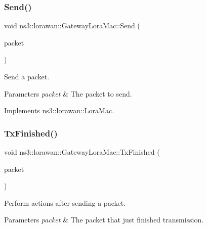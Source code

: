 \mbox{\label{classns3_1_1lorawan_1_1GatewayLoraMac_adc8823176576f9d19d4ae663d88d869e}} 
\subsubsection{\texorpdfstring{Send()}{Send()}}
{\footnotesize\ttfamily void ns3\+::lorawan\+::\+Gateway\+Lora\+Mac\+::\+Send (\begin{DoxyParamCaption}\item[{Ptr$<$ Packet $>$}]{packet }\end{DoxyParamCaption})\hspace{0.3cm}{\ttfamily [virtual]}}

Send a packet.


\begin{DoxyParams}{Parameters}
{\em packet} & The packet to send. \\
\hline
\end{DoxyParams}


Implements \hyperlink{classns3_1_1lorawan_1_1LoraMac_ac2f3fd92536658192bfa3d1523fff716}{ns3\+::lorawan\+::\+Lora\+Mac}.

\mbox{\label{classns3_1_1lorawan_1_1GatewayLoraMac_a115cbb38716b278b7bac756386a5ae77}} 
\subsubsection{\texorpdfstring{Tx\+Finished()}{TxFinished()}}
{\footnotesize\ttfamily void ns3\+::lorawan\+::\+Gateway\+Lora\+Mac\+::\+Tx\+Finished (\begin{DoxyParamCaption}\item[{Ptr$<$ Packet const $>$}]{packet }\end{DoxyParamCaption})\hspace{0.3cm}{\ttfamily [virtual]}}

Perform actions after sending a packet.


\begin{DoxyParams}{Parameters}
{\em packet} & The packet that just finished transmission. \\
\hline
\end{DoxyParams}


